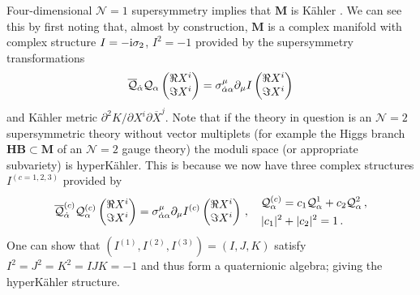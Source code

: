 \documentclass[main.tex]{subfiles}
\begin{document}
Four-dimensional $\mathcal{N}=1$ supersymmetry implies that $\mathbf{M}$ is K\"ahler \cite{Zumino:1979et}.  We can see this by first noting that, almost by construction, $\mathbf{M}$ is a complex manifold with complex structure $I=-\mathrm{i} \sigma_2$, $I^2=-1$ provided by the supersymmetry transformations 
\begin{equation}
\overline{\mathcal{Q}}_{\dot\alpha}\mathcal{Q}_{\alpha}\begin{pmatrix}
\Re X^i\\
\Im X^i
\end{pmatrix}=\sigma_{\dot\alpha\alpha}^{\mu}\partial_{\mu}I\begin{pmatrix}
\Re X^i\\
\Im X^i
\end{pmatrix}
\end{equation} 
and K\"ahler metric $\partial^2K/\partial{X^i}\partial{\overline{X}^j}$.  
Note that if the theory in question is an $\mathcal{N}=2$ supersymmetric theory without vector multiplets (for example the Higgs branch $\mathbf{HB}\subset\mathbf{M}$ of an $\mathcal{N}=2$ gauge theory) the moduli space (or appropriate subvariety) is hyperK\"ahler.  This is because we now have three complex structures $I^{(c=1,2,3)}$ provided by 
\begin{equation}
\overline{\mathcal{Q}}^{(c)}_{\dot\alpha}\mathcal{Q}^{(c)}_{\alpha}\begin{pmatrix}
\Re X^i\\
\Im X^i
\end{pmatrix}=\sigma_{\dot\alpha\alpha}^{\mu}\partial_{\mu}I^{(c)}\begin{pmatrix}
\Re X^i\\
\Im X^i
\end{pmatrix}\,,\quad \begin{aligned}&\mathcal{Q}^{(c)}_{\alpha}=c_1\mathcal{Q}^1_{\alpha}+c_2\mathcal{Q}^2_{\alpha}\,,\\&|c_1|^2+|c_2|^2=1\,.\end{aligned}
\end{equation}
One can show that $(I^{(1)},I^{(2)},I^{(3)})=(I,J,K)$ satisfy $I^2=J^2=K^2=IJK=-1$ and thus form a quaternionic algebra; giving the hyperK\"ahler structure.
\end{document}
